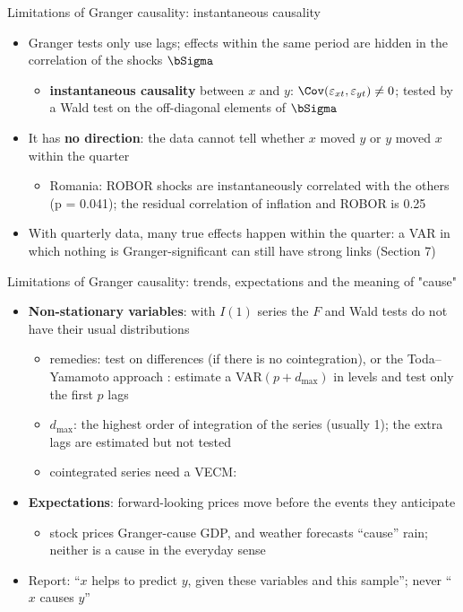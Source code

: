 \begin{frame}{Limitations of Granger causality: instantaneous causality}
\itemsize{\small}
\begin{itemize}
    \item Granger tests only use lags; effects within the same period are hidden in the correlation of the shocks $\bSigma$
    \begin{itemize}
        \item \textbf{instantaneous causality} between $x$ and $y$: $\Cov(\varepsilon_{xt}, \varepsilon_{yt}) \ne 0$; tested by a Wald test on the off-diagonal elements of $\bSigma$
    \end{itemize}
    \item It has \textbf{no direction}: the data cannot tell whether $x$ moved $y$ or $y$ moved $x$ within the quarter
    \begin{itemize}
        \item Romania: ROBOR shocks are instantaneously correlated with the others (p = 0.041); the residual correlation of inflation and ROBOR is 0.25
    \end{itemize}
    \item With quarterly data, many true effects happen within the quarter: a VAR in which nothing is Granger-significant can still have strong links (Section 7)
\end{itemize}
\end{frame}

\begin{frame}{Limitations of Granger causality: trends, expectations and the meaning of "cause"}
\itemsize{\small}
\begin{itemize}
    \item \textbf{Non-stationary variables}: with $I(1)$ series the $F$ and Wald tests do not have their usual distributions 
    \begin{itemize}
        \item remedies: test on differences (if there is no cointegration), or the Toda--Yamamoto approach : estimate a VAR$(p + d_{\max})$ in levels and test only the first $p$ lags
        \item $d_{\max}$: the highest order of integration of the series (usually 1); the extra lags are estimated but not tested
        \item cointegrated series need a VECM: 
    \end{itemize}
    \item \textbf{Expectations}: forward-looking prices move before the events they anticipate
    \begin{itemize}
        \item stock prices Granger-cause GDP, and weather forecasts ``cause'' rain; neither is a cause in the everyday sense
    \end{itemize}
    \item Report: ``$x$ helps to predict $y$, given these variables and this sample''; never ``$x$ causes $y$''
\end{itemize}
\end{frame}

